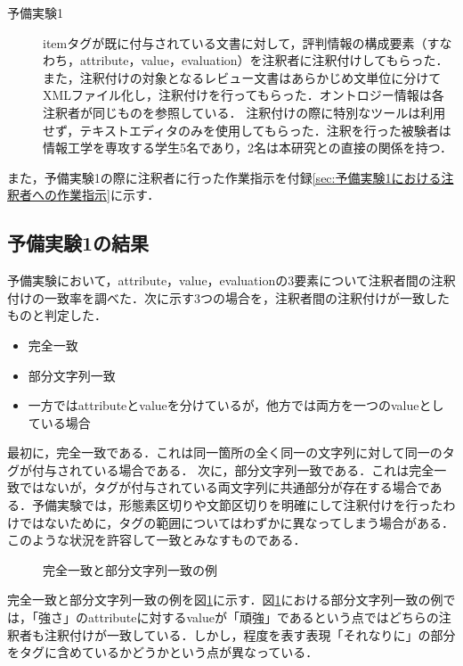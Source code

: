 \documentclass[japanese]{jnlp_1.4}
\begin{document}
\begin{description}
\item[予備実験1]
itemタグが既に付与されている文書に対して，評判情報の構成要素（すなわち，attribute，value，evaluation）を注釈者に注釈付けしてもらった．また，注釈付けの対象となるレビュー文書はあらかじめ文単位に分けてXMLファイル化し，注釈付けを行ってもらった．オントロジー情報は各注釈者が同じものを参照している．
注釈付けの際に特別なツールは利用せず，テキストエディタのみを使用してもらった．注釈を行った被験者は情報工学を専攻する学生5名であり，2名は本研究との直接の関係を持つ．
\end{description}

また，予備実験1の際に注釈者に行った作業指示を付録\ref{sec:予備実験1における注釈者への作業指示}に示す．


\subsection{予備実験1の結果}
\label{sec:予備実験1の結果}

予備実験において，attribute，value，evaluationの3要素について注釈者間の注釈付けの一致率を調べた．次に示す3つの場合を，注釈者間の注釈付けが一致したものと判定した．


\begin{itemize}
\item
完全一致
\item
部分文字列一致
\item
一方ではattributeとvalueを分けているが，他方では両方を一つのvalueとしている場合
\end{itemize}

最初に，完全一致である．これは同一箇所の全く同一の文字列に対して同一のタグが付与されている場合である．
次に，部分文字列一致である．これは完全一致ではないが，タグが付与されている両文字列に共通部分が存在する場合である．予備実験では，形態素区切りや文節区切りを明確にして注釈付けを行ったわけではないために，タグの範囲についてはわずかに異なってしまう場合がある．このような状況を許容して一致とみなすものである．

\begin{figure}[b]

\caption{完全一致と部分文字列一致の例}
\label{fig:完全一致と部分文字列一致の例}
\end{figure}

完全一致と部分文字列一致の例を図\ref{fig:完全一致と部分文字列一致の例}に示す．図\ref{fig:完全一致と部分文字列一致の例}における部分文字列一致の例では，「強さ」のattributeに対するvalueが「頑強」であるという点ではどちらの注釈者も注釈付けが一致している．しかし，程度を表す表現「それなりに」の部分をタグに含めているかどうかという点が異なっている．
\end{document}
